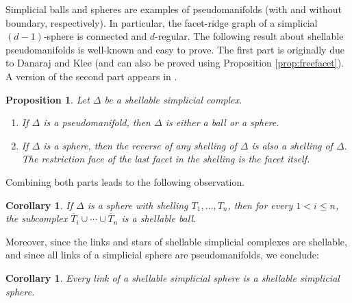\documentclass[11pt,twoside]{article}
\newtheorem{corollary}[theorem]{Corollary}
\newtheorem{proposition}[theorem]{Proposition}
\theoremstyle{definition}
\begin{document}
Simplicial balls and spheres are examples of pseudomanifolds (with and without boundary, respectively). In particular, the facet-ridge graph of a simplicial $(d-1)$-sphere is connected and $d$-regular. The following result about shellable pseudomanifolds is well-known and easy to prove. The first part is originally due to Danaraj and Klee \cite{klee} (and can also be proved using Proposition \ref{prop:freefacet}).  A version of the second part appears in \cite[Chapter 8]{Ziegler}.
\begin{proposition}\label{prop:shellingwellknown}
    Let $\Delta$ be a shellable simplicial complex. 
    \begin{enumerate}
        \item If $\Delta$ is a pseudomanifold, then $\Delta$ is either a ball or a sphere.
        \item If $\Delta$ is a sphere, then the reverse of any shelling of $\Delta$ is also a shelling of $\Delta$. The restriction face of the last facet in the shelling is the facet itself. 
    \end{enumerate}
\end{proposition}
Combining both parts leads to the following observation. 
\begin{corollary}\label{cor:shellingball}
If $\Delta$ is a sphere with shelling $T_1, \dots, T_n$, then for every $1 < i \le n$, the subcomplex $\overline{T}_i \cup \cdots \cup \overline{T}_n$ is a shellable ball. 
\end{corollary}
Moreover, since the links and stars of shellable simplicial complexes are shellable, and since all links of a simplicial sphere are pseudomanifolds, we conclude: 
\begin{corollary}\label{cor:shellspherelink}
Every link of a shellable simplicial sphere is a shellable simplicial sphere. 
\end{corollary}
\end{document}
